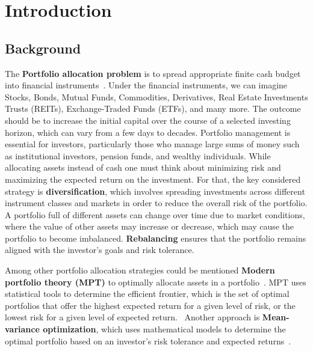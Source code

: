 


\chapter{Introduction}\label{ch:introduction}


\section{Background}\label{sec:background}
The \textbf{Portfolio allocation problem} is to spread appropriate finite cash budget into financial instruments~\cite{Model-Free-Reinforcement-Learning-for-Asset-Allocation}.
Under the financial instruments, we can imagine Stocks, Bonds, Mutual Funds, Commodities, Derivatives, Real Estate Investments Trusts (REITs), Exchange-Traded Funds (ETFs), and many more.
The outcome should be to increase the initial capital over the course of a selected investing horizon, which can vary from a few days to decades.
Portfolio management is essential for investors, particularly those who manage large sums of money such as institutional investors, pension funds, and wealthy individuals.
While allocating assets instead of cash one must think about minimizing risk and maximizing the expected return on the investment.
For that, the key considered strategy is \textbf{diversification}, which involves spreading investments across different instrument classes and markets in order to reduce the overall risk of the portfolio.
A portfolio full of different assets can change over time due to market conditions, where the value of other assets may increase or decrease, which may cause the portfolio to become imbalanced.
\textbf{Rebalancing} ensures that the portfolio remains aligned with the investor's goals and risk tolerance.

Among other portfolio allocation strategies could be mentioned \textbf{Modern portfolio theory (MPT)} to optimally allocate assets in a portfolio~\cite{modern-portfolio-theory}.
MPT uses statistical tools to determine the efficient frontier, which is the set of optimal portfolios that offer the highest expected return for a given level of risk, or the lowest risk for a given level of expected return.~\cite{sirucek-2015}
Another approach is \textbf{Mean-variance optimization}, which uses mathematical models to determine the optimal portfolio based on an investor's risk tolerance and expected returns~\cite{meanvarianceportfoliooptimazation}.

